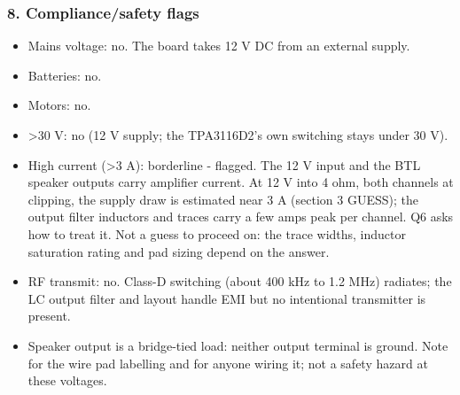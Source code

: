 \documentclass[11pt,a4paper]{article}
\begin{document}
\subsubsection*{8. Compliance/safety flags}
\begin{itemize}
\item Mains voltage: no. The board takes 12 V DC from an external supply.
\item Batteries: no.
\item Motors: no.
\item \textgreater{}30 V: no (12 V supply; the TPA3116D2's own switching stays under 30 V).
\item High current (\textgreater{}3 A): borderline - flagged. The 12 V input and the BTL speaker outputs carry
amplifier current. At 12 V into 4 ohm, both channels at clipping, the supply draw is estimated
near 3 A (section 3 GUESS); the output filter inductors and traces carry a few amps peak per
channel. Q6 asks how to treat it. Not a guess to proceed on: the trace widths, inductor
saturation rating and pad sizing depend on the answer.
\item RF transmit: no. Class-D switching (about 400 kHz to 1.2 MHz) radiates; the LC output filter
and layout handle EMI but no intentional transmitter is present.
\item Speaker output is a bridge-tied load: neither output terminal is ground. Note for the wire pad
labelling and for anyone wiring it; not a safety hazard at these voltages.
\end{itemize}
\end{document}
